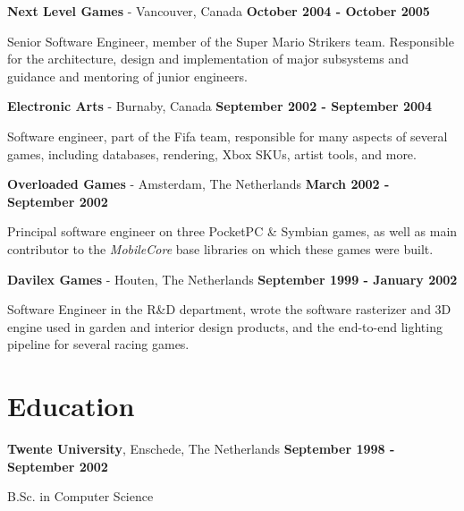 \documentclass[margin, line]{resume}
\begin{document}
\begin{resume}
{\bf Next Level Games} - Vancouver, Canada \hfill {\bf October 2004 - October 2005}

Senior Software Engineer, member of the Super Mario Strikers team.
Responsible for the architecture, design and implementation of major
subsystems and guidance and mentoring of junior engineers.

{\bf Electronic Arts} - Burnaby, Canada \hfill {\bf September 2002 - September 2004}

Software engineer, part of the Fifa team, responsible for many
aspects of several games, including databases, rendering, Xbox SKUs,
artist tools, and more.

{\bf Overloaded Games} - Amsterdam, The Netherlands \hfill {\bf March 2002 - September 2002}

Principal software engineer on three PocketPC \& Symbian games, as well as main contributor to the 
\emph{MobileCore} base libraries on which these games were built.

{\bf Davilex Games} - Houten, The Netherlands \hfill {\bf September 1999 - January 2002}

Software Engineer in the R\&D department, wrote the software rasterizer and 3D engine used in garden and interior design products, and the end-to-end lighting pipeline for several racing games.

\pagebreak

\section{\sc Education}
{\bf Twente University}, Enschede, The Netherlands \hfill {\bf September 1998 - September 2002}

B.Sc. in Computer Science


\end{resume}
\end{document}
